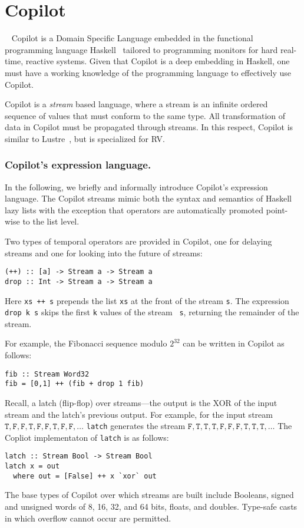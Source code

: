 \section{Copilot}~\label{sec:co-intro} 
Copilot is a Domain Specific Language embedded in the functional
programming language Haskell~\cite{Haskell98}   tailored to
programming monitors for hard real-time, reactive systems. Given that
Copilot is a deep embedding in Haskell, one must have a working
knowledge of the programming language to effectively use Copilot. 

 Copilot is a \emph{stream} based language, where a stream is an infinite ordered
 sequence of values that must conform to the same type.  All
 transformation of data in Copilot must be propagated through
 streams.  In this respect, Copilot is similar to 
 Lustre~\cite{CaspiPHP87}, but is specialized for RV. 



\subsubsection{Copilot's expression language.}
In the following, we briefly and informally introduce Copilot's expression
language.  The Copilot streams mimic both the syntax and semantics of
Haskell lazy lists with the exception that  operators are
automatically promoted point-wise to the list level. 

Two types of temporal operators are provided in Copilot, one for
delaying streams and one for looking into the future of streams:
\begin{lstlisting}[frame=single]
(++) :: [a] -> Stream a -> Stream a
drop :: Int -> Stream a -> Stream a
\end{lstlisting}
%
Here {\tt xs ++ s} prepends the list {\tt xs} at the front of the stream {\tt s}.
The expression {\tt drop k s} skips the first {\tt k} values of the stream {\tt
  s}, returning the remainder of the stream.



 For example, the Fibonacci sequence modulo $2^{32}$ can be written in Copilot as follows:

\begin{lstlisting}[frame=single]
fib :: Stream Word32
fib = [0,1] ++ (fib + drop 1 fib)
\end{lstlisting}
%
Recall, a 
latch (flip-flop) over streams---the output is the XOR of the input stream and
the latch's previous output.  For example, for the input stream
$\mathtt{T, F, F, T, F, F, T, F, F,}\dots$
{\tt latch} generates the stream
$\mathtt{F, T, T, T, F, F, F, T, T, T,}\ldots$
The Copliot implementaton of {\tt latch} is as follows:
%
\begin{lstlisting}[frame=single]
latch :: Stream Bool -> Stream Bool
latch x = out
  where out = [False] ++ x `xor` out
\end{lstlisting}
%
The base types of Copilot over which streams are built include Booleans, signed
and unsigned words of 8, 16, 32, and 64 bits, floats, and doubles. Type-safe
casts in which overflow cannot occur are permitted.

